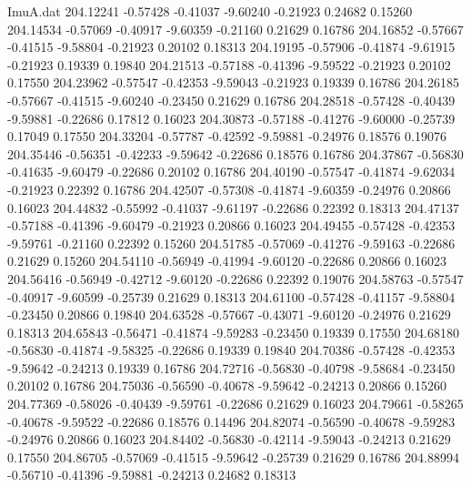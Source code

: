 \begin{filecontents}{ImuA.dat}
 204.12241   -0.57428   -0.41037   -9.60240   -0.21923    0.24682    0.15260
 204.14534   -0.57069   -0.40917   -9.60359   -0.21160    0.21629    0.16786
 204.16852   -0.57667   -0.41515   -9.58804   -0.21923    0.20102    0.18313
 204.19195   -0.57906   -0.41874   -9.61915   -0.21923    0.19339    0.19840
 204.21513   -0.57188   -0.41396   -9.59522   -0.21923    0.20102    0.17550
 204.23962   -0.57547   -0.42353   -9.59043   -0.21923    0.19339    0.16786
 204.26185   -0.57667   -0.41515   -9.60240   -0.23450    0.21629    0.16786
 204.28518   -0.57428   -0.40439   -9.59881   -0.22686    0.17812    0.16023
 204.30873   -0.57188   -0.41276   -9.60000   -0.25739    0.17049    0.17550
 204.33204   -0.57787   -0.42592   -9.59881   -0.24976    0.18576    0.19076
 204.35446   -0.56351   -0.42233   -9.59642   -0.22686    0.18576    0.16786
 204.37867   -0.56830   -0.41635   -9.60479   -0.22686    0.20102    0.16786
 204.40190   -0.57547   -0.41874   -9.62034   -0.21923    0.22392    0.16786
 204.42507   -0.57308   -0.41874   -9.60359   -0.24976    0.20866    0.16023
 204.44832   -0.55992   -0.41037   -9.61197   -0.22686    0.22392    0.18313
 204.47137   -0.57188   -0.41396   -9.60479   -0.21923    0.20866    0.16023
 204.49455   -0.57428   -0.42353   -9.59761   -0.21160    0.22392    0.15260
 204.51785   -0.57069   -0.41276   -9.59163   -0.22686    0.21629    0.15260
 204.54110   -0.56949   -0.41994   -9.60120   -0.22686    0.20866    0.16023
 204.56416   -0.56949   -0.42712   -9.60120   -0.22686    0.22392    0.19076
 204.58763   -0.57547   -0.40917   -9.60599   -0.25739    0.21629    0.18313
 204.61100   -0.57428   -0.41157   -9.58804   -0.23450    0.20866    0.19840
 204.63528   -0.57667   -0.43071   -9.60120   -0.24976    0.21629    0.18313
 204.65843   -0.56471   -0.41874   -9.59283   -0.23450    0.19339    0.17550
 204.68180   -0.56830   -0.41874   -9.58325   -0.22686    0.19339    0.19840
 204.70386   -0.57428   -0.42353   -9.59642   -0.24213    0.19339    0.16786
 204.72716   -0.56830   -0.40798   -9.58684   -0.23450    0.20102    0.16786
 204.75036   -0.56590   -0.40678   -9.59642   -0.24213    0.20866    0.15260
 204.77369   -0.58026   -0.40439   -9.59761   -0.22686    0.21629    0.16023
 204.79661   -0.58265   -0.40678   -9.59522   -0.22686    0.18576    0.14496
 204.82074   -0.56590   -0.40678   -9.59283   -0.24976    0.20866    0.16023
 204.84402   -0.56830   -0.42114   -9.59043   -0.24213    0.21629    0.17550
 204.86705   -0.57069   -0.41515   -9.59642   -0.25739    0.21629    0.16786
 204.88994   -0.56710   -0.41396   -9.59881   -0.24213    0.24682    0.18313

\end{filecontents}
